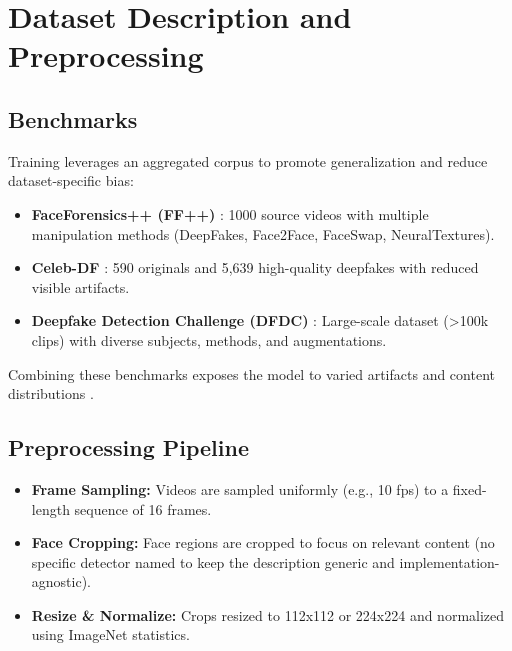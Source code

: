 \section{Dataset Description and Preprocessing}
\subsection{Benchmarks}
Training leverages an aggregated corpus to promote generalization and reduce dataset-specific bias:
\begin{itemize}
    \item \textbf{FaceForensics++ (FF++)} \cite{rossler2019faceforensics}: 1000 source videos with multiple manipulation methods (DeepFakes, Face2Face, FaceSwap, NeuralTextures).
    \item \textbf{Celeb-DF} \cite{li2020celebdf}: 590 originals and 5{,}639 high-quality deepfakes with reduced visible artifacts.
    \item \textbf{Deepfake Detection Challenge (DFDC)} \cite{dolhansky2020dfdc}: Large-scale dataset (>100k clips) with diverse subjects, methods, and augmentations.
\end{itemize}
Combining these benchmarks exposes the model to varied artifacts and content distributions \cite{gong2024survey}.

\subsection{Preprocessing Pipeline}
\begin{itemize}
    \item \textbf{Frame Sampling:} Videos are sampled uniformly (e.g., 10 fps) to a fixed-length sequence of 16 frames.
    \item \textbf{Face Cropping:} Face regions are cropped to focus on relevant content (no specific detector named to keep the description generic and implementation-agnostic).
    \item \textbf{Resize \& Normalize:} Crops resized to 112x112 or 224x224 and normalized using ImageNet statistics.
\end{itemize}

